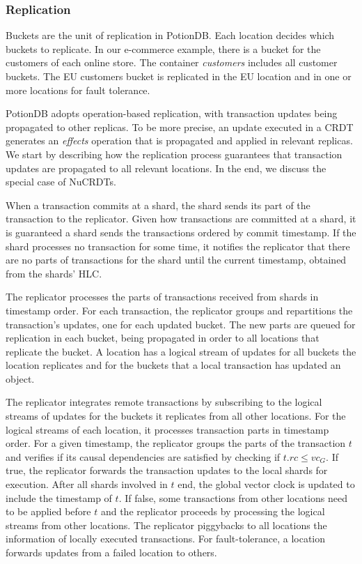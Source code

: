 \documentclass[sigplan,twocolumn,review,anonymous]{acmart}
\begin{document}
\subsubsection{Replication}
\label{sec:replication}

Buckets are the unit of replication in PotionDB.  Each location decides which buckets to replicate.
In our e-commerce example, there is a bucket for 
the customers of each online store.  The container \emph{customers} includes all customer buckets.
The EU customers bucket is  replicated in the EU location and
in one or more locations for fault tolerance.

PotionDB adopts operation-based replication, with transaction updates 
being propagated to other replicas. To be more precise, an update
executed in a CRDT generates an \emph{effects} operation that is
propagated and applied in relevant replicas. We start by describing how the replication process
guarantees that transaction updates are propagated to all relevant locations. In the end, 
we discuss the special case of NuCRDTs.

When a transaction commits at a shard, the shard sends its part of the transaction to the replicator.  
Given how transactions are committed at a shard, it is guaranteed a shard sends the transactions
ordered by commit timestamp.
If the shard processes no transaction for some time, it notifies the replicator that there are
no parts of transactions for the shard until the current timestamp, obtained from the shards' HLC.

The replicator processes the parts of transactions received from shards in timestamp order. 
For each transaction, the replicator groups and repartitions the transaction's updates, 
one for each updated bucket. The new parts are queued 
for replication in each bucket, being propagated in order to all locations that 
replicate the bucket. 
A location has a logical stream of updates for all buckets the location replicates
and for the buckets that a local transaction has updated an object.

The replicator integrates remote transactions by subscribing 
to the logical streams of updates for the buckets it replicates from all other 
locations. For the logical streams of each location, it processes transaction parts in timestamp order.
For a given timestamp, the replicator groups the parts of the transaction $t$ and verifies if its causal dependencies 
are satisfied by checking if $t.rc \leq \mathit{vc}_G$.
If true, the replicator 
forwards the
transaction updates to the local shards for execution. 
After all shards involved in $t$ end, 
the global
vector clock is updated to include the timestamp of $t$. If false, some transactions
from other locations need to be applied before $t$ and the replicator proceeds by processing
the logical streams from other locations.
The replicator piggybacks to all locations the information of locally executed transactions.
For fault-tolerance, a location forwards updates from a failed
location to others.
\end{document}
